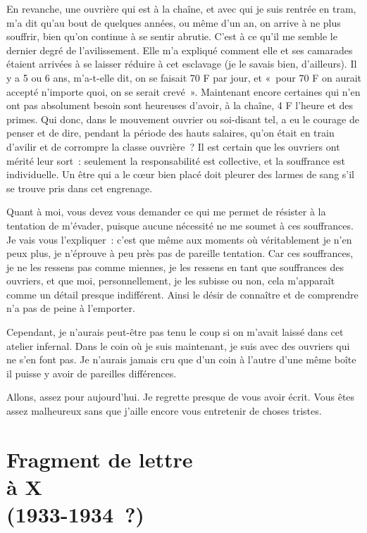 \documentclass[french,twoside]{book} %
\newcommand{\salute}[1]{\bigbreak{#1}\par\medbreak}
\newcommand{\signed}[1]{\bigbreak\filbreak{\raggedleft #1\par}\medskip}
\begin{document}
En revanche, une ouvrière qui est à la chaîne, et avec qui je suis rentrée en tram, m'a dit qu'au bout de quelques années, ou même d'un an, on arrive à ne plus souffrir, bien qu'on continue à se sentir abrutie. C'est à ce qu'il me semble le dernier degré de l'avilissement. Elle m'a expliqué comment elle et ses camarades étaient arrivées à se laisser réduire à cet esclavage (je le savais bien, d'ailleurs). Il y a 5 ou 6 ans, m'a-t-elle dit, on se faisait 70 F par jour, et « pour 70 F on aurait accepté n'importe quoi, on se serait crevé ». Maintenant encore certaines qui n'en ont pas absolument besoin sont heureuses d'avoir, à la chaîne, 4 F l'heure et des primes. Qui donc, dans le mouvement ouvrier ou soi-disant tel, a eu le courage de penser et de dire, pendant la période des hauts salaires, qu'on était en train d'avilir et de corrompre la classe ouvrière ? Il est certain que les ouvriers ont mérité leur sort : seulement la responsabilité est collective, et la souffrance est individuelle. Un être qui a le cœur bien placé doit pleurer des larmes de sang s'il se trouve pris dans cet engrenage.\par
Quant à moi, vous devez vous demander ce qui me permet de résister à la tentation de m'évader, puisque aucune nécessité ne me soumet à ces souffrances. Je vais vous l'expliquer : c'est que même aux moments où véritablement je n'en peux plus, je n'éprouve à peu près pas de pareille tentation. Car ces souffrances, je ne les ressens pas comme miennes, je les ressens en tant que souffrances des ouvriers, et que moi, personnellement, je les subisse ou non, cela m'apparaît comme un détail presque indifférent. Ainsi le désir de connaître et de comprendre n'a pas de peine à l'emporter.\par
Cependant, je n'aurais peut-être pas tenu le coup si on m'avait laissé dans cet atelier infernal. Dans le coin où je suis maintenant, je suis avec des ouvriers qui ne s'en font pas. Je n'aurais jamais cru que d'un coin à l'autre d'une même boîte il puisse y avoir de pareilles différences.\par
Allons, assez pour aujourd'hui. Je regrette presque de vous avoir écrit. Vous êtes assez malheureux sans que j'aille encore vous entretenir de choses tristes.\par

\salute{Affectueusement.}


\signed{S. W.}
\section[Fragment de lettre, à X, (1933-1934 ?)]{Fragment de lettre \\
à X \\
(1933-1934 ?)}\renewcommand{\leftmark}{Fragment de lettre \\
à X \\
(1933-1934 ?)}
\end{document}
